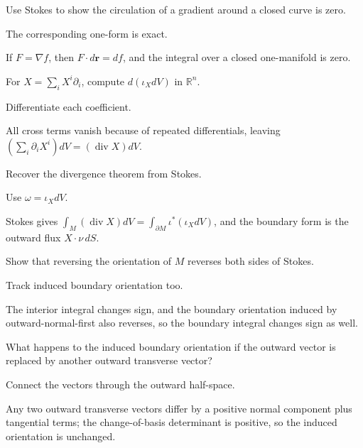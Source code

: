 \begin{exercise}\label{exr:vii11-14}
Use Stokes to show the circulation of a gradient around a closed curve is zero.
\end{exercise}
\begin{hint}
The corresponding one-form is exact.
\end{hint}
\begin{solution}
If $F=\nabla f$, then $F\cdot d\mathbf r=df$, and the integral over a closed one-manifold is zero.
\end{solution}

\begin{exercise}\label{exr:vii11-15}
For $X=\sum_iX^i\partial_i$, compute $d(\iota_XdV)$ in $\mathbb R^n$.
\end{exercise}
\begin{hint}
Differentiate each coefficient.
\end{hint}
\begin{solution}
All cross terms vanish because of repeated differentials, leaving $(\sum_i\partial_iX^i)dV=(\operatorname{div}X)dV$.
\end{solution}

\begin{exercise}\label{exr:vii11-16}
Recover the divergence theorem from Stokes.
\end{exercise}
\begin{hint}
Use $\omega=\iota_XdV$.
\end{hint}
\begin{solution}
Stokes gives $\int_M(\operatorname{div}X)dV=\int_{\partial M}\iota^*(\iota_XdV)$, and the boundary form is the outward flux $X\cdot\nu\,dS$.
\end{solution}

\begin{exercise}\label{exr:vii11-17}
Show that reversing the orientation of $M$ reverses both sides of Stokes.
\end{exercise}
\begin{hint}
Track induced boundary orientation too.
\end{hint}
\begin{solution}
The interior integral changes sign, and the boundary orientation induced by outward-normal-first also reverses, so the boundary integral changes sign as well.
\end{solution}

\begin{exercise}\label{exr:vii11-18}
What happens to the induced boundary orientation if the outward vector is replaced by another outward transverse vector?
\end{exercise}
\begin{hint}
Connect the vectors through the outward half-space.
\end{hint}
\begin{solution}
Any two outward transverse vectors differ by a positive normal component plus tangential terms; the change-of-basis determinant is positive, so the induced orientation is unchanged.
\end{solution}

